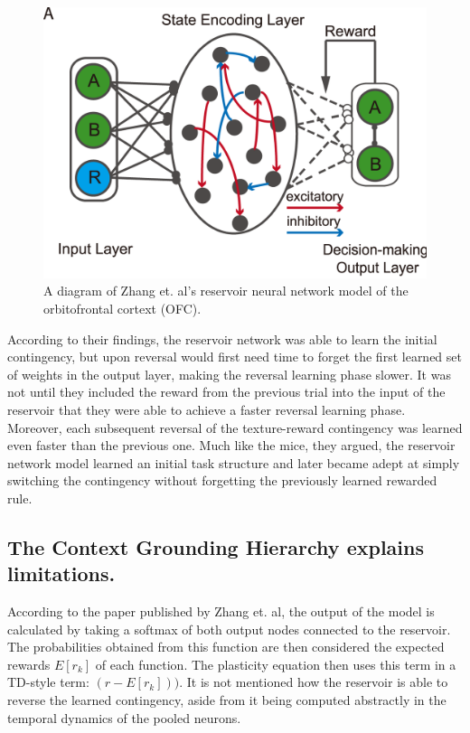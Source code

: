 \documentclass[11pt]{article}
\begin{document}
\begin{figure}
	\centering
	\includegraphics[scale=0.25]{./zhang_reservoir_architecture.PNG}
	\caption{A diagram of Zhang et. al's reservoir neural network model of the orbitofrontal cortext (OFC).}
	\label{fig:2}
\end{figure}

According to their findings, the reservoir network was able to learn the initial contingency, but upon reversal would first need time to forget the first learned set of weights in the output layer, making the reversal learning phase slower.  It was not until they included the reward from the previous trial into the input of the reservoir that they were able to achieve a faster reversal learning phase.  Moreover, each subsequent reversal of the texture-reward contingency was learned even faster than the previous one.  Much like the mice, they argued, the reservoir network model learned an initial task structure and later became adept at simply switching the contingency without forgetting the previously learned rewarded rule.

\subsection{The Context Grounding Hierarchy explains limitations.}
According to the paper published by Zhang et. al, the output of the model is calculated by taking a softmax of both output nodes connected to the reservoir.  The probabilities obtained from this function are then considered the expected rewards $E[r_k]$ of each function.  The plasticity equation  then uses this term in a TD-style term: $(r - E[r_k]))$.  It is not mentioned how the reservoir is able to reverse the learned contingency, aside from it being computed abstractly in the temporal dynamics of the pooled neurons.
\end{document}
